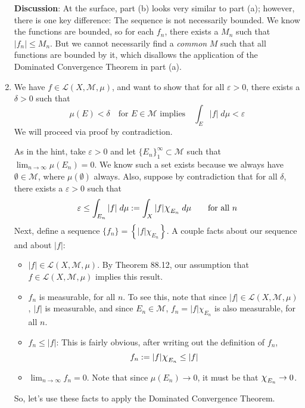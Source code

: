 \documentclass[12pt]{article}
\theoremstyle{plain}
\theoremstyle{definition}
\theoremstyle{remark}
\newcommand*{\Chi}{\mbox{\large$\chi$}} %
\begin{document}
\begin{enumerate}
\begin{enumerate}
\end{enumerate}

\textbf{Discussion}: At the surface, part (b) looks very similar to part (a); however, there is one key difference: The sequence is not necessarily bounded. We know the functions are bounded, so for each $f_n$, there exists a $M_n$ such that $|f_n|\leq M_n$. But we cannot necessarily find a \emph{common} $M$ such that all functions are bounded by it, which disallows the application of the Dominated Convergence Theorem in part (a).

\item We have $f\in\mathscr{L}(X,\mathscr{M},\mu)$, and want to show that for all $\varepsilon>0$, there exists a $\delta>0$ such that 
\[
    \mu(E)<\delta \quad \text{for $E\in\mathscr{M}$ implies}
    \quad \int_E |f| \; d\mu <\varepsilon
\]
We will proceed via proof by contradiction.

As in the hint, take $\varepsilon>0$ and let $\{E_n\}^\infty_1 \subset \mathscr{M}$ such that $\lim_{n\rightarrow\infty} \mu(E_n)=0$. We know such a set exists because we always have $\emptyset \in \mathscr{M}$, where $\mu(\emptyset)$ always. Also, suppose by contradiction that for all $\delta$, there exists a $\varepsilon>0$ such that 
\begin{equation}
    \label{q4}
    \varepsilon\leq \int_{E_n} |f| \; d\mu :=
    \int_X |f|\Chi_{E_n} \; d\mu
    \qquad\text{for all $n$}
\end{equation}
Next, define a sequence $\{f_n\}=\left\{|f|\chi_{E_n}\right\}$. A couple facts about our sequence and about $|f|$:
\begin{itemize}
    \item $|f|\in\mathscr{L}(X,\mathscr{M},\mu)$. By Theorem 88.12, our assumption that $f\in\mathscr{L}(X,\mathscr{M},\mu)$ implies this result.
    \item $f_n$ is measurable, for all $n$. To see this, note that since $|f|\in\mathscr{L}(X,\mathscr{M},\mu)$, $|f|$ is measurable, and since $E_n\in\mathscr{M}$, $f_n = |f|\chi_{E_n}$ is also measurable, for all $n$.
    \item $f_n \leq |f|$: This is fairly obvious, after writing out the definition of $f_n$, 
\begin{equation}
    \label{dtcapply}
    f_n := |f|\Chi_{E_n}\leq |f|
\end{equation}
    \item $\lim_{n\rightarrow\infty}f_n=0$. Note that since $\mu(E_n)\rightarrow 0$, it must be that $\Chi_{E_n}\rightarrow 0$. 
\end{itemize}
So, let's use these facts to apply the Dominated Convergence Theorem. 


\end{enumerate}
\end{document}
